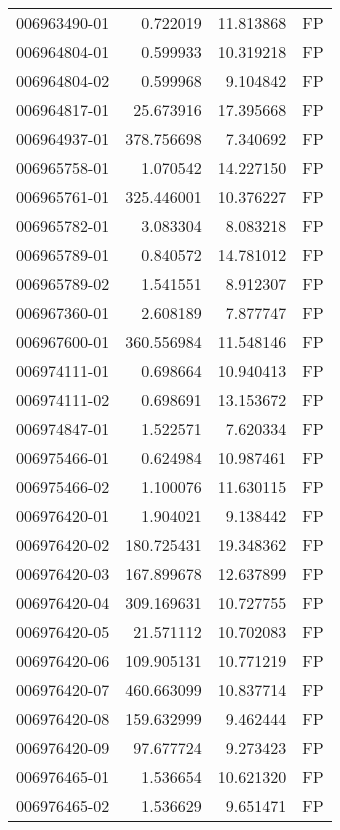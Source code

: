 \begin{tabular}{lrrl}
006963490-01 &    0.722019 &      11.813868 &   FP \\
006964804-01 &    0.599933 &      10.319218 &   FP \\
006964804-02 &    0.599968 &       9.104842 &   FP \\
006964817-01 &   25.673916 &      17.395668 &   FP \\
006964937-01 &  378.756698 &       7.340692 &   FP \\
006965758-01 &    1.070542 &      14.227150 &   FP \\
006965761-01 &  325.446001 &      10.376227 &   FP \\
006965782-01 &    3.083304 &       8.083218 &   FP \\
006965789-01 &    0.840572 &      14.781012 &   FP \\
006965789-02 &    1.541551 &       8.912307 &   FP \\
006967360-01 &    2.608189 &       7.877747 &   FP \\
006967600-01 &  360.556984 &      11.548146 &   FP \\
006974111-01 &    0.698664 &      10.940413 &   FP \\
006974111-02 &    0.698691 &      13.153672 &   FP \\
006974847-01 &    1.522571 &       7.620334 &   FP \\
006975466-01 &    0.624984 &      10.987461 &   FP \\
006975466-02 &    1.100076 &      11.630115 &   FP \\
006976420-01 &    1.904021 &       9.138442 &   FP \\
006976420-02 &  180.725431 &      19.348362 &   FP \\
006976420-03 &  167.899678 &      12.637899 &   FP \\
006976420-04 &  309.169631 &      10.727755 &   FP \\
006976420-05 &   21.571112 &      10.702083 &   FP \\
006976420-06 &  109.905131 &      10.771219 &   FP \\
006976420-07 &  460.663099 &      10.837714 &   FP \\
006976420-08 &  159.632999 &       9.462444 &   FP \\
006976420-09 &   97.677724 &       9.273423 &   FP \\
006976465-01 &    1.536654 &      10.621320 &   FP \\
006976465-02 &    1.536629 &       9.651471 &   FP \\

\end{tabular}

